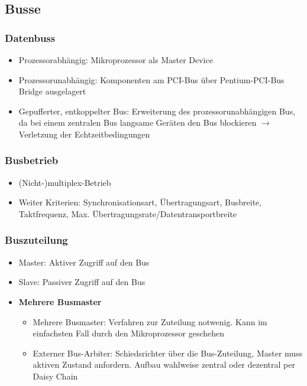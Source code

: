 \subsection{Busse}

\subsubsection{Datenbuss}
\begin{itemize}
	\item Prozessorabhängig: Mikroprozessor als Master Device
	\item Prozessorunabhängig: Komponenten am PCI-Bus über Pentium-PCI-Bus Bridge ausgelagert
	\item Gepufferter, entkoppelter Bus: Erweiterung des prozessorunabhängigen Bus, da bei einem zentralen Bus langsame Geräten den Bus blockieren $\rightarrow$ Verletzung der Echtzeitbedingungen
\end{itemize}

\subsubsection{Busbetrieb}
\begin{itemize}
	\item (Nicht-)multiplex-Betrieb
	\item Weiter Kriterien: Synchronisationsart, Übertragungsart, Busbreite, Taktfrequenz, Max. Übertragungsrate/Datentransportbreite
\end{itemize}

\subsubsection{Buszuteilung}
\begin{itemize}
	\item Master: Aktiver Zugriff auf den Bus
	\item Slave: Passiver Zugriff auf den Bus
	\item \textbf{Mehrere Busmaster}
	\begin{itemize}
		\item Mehrere Busmaster: Verfahren zur Zuteilung notwenig. Kann im einfachsten Fall durch den Mikroprozessor geschehen
		\item Externer Bus-Arbiter: Schiedsrichter über die Bus-Zuteilung, Master muss aktiven Zustand anfordern. Aufbau wahlweise zentral oder dezentral per Daisy Chain
	\end{itemize}
\end{itemize}

